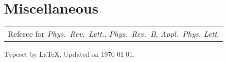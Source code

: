 \documentclass[a4paper, 11pt, DIV=15,headings=normal]{scrartcl}
\begin{document}
\section*{Miscellaneous}
\begin{tabular}{l}
Referee for \textit{Phys.\ Rev.\ Lett.}, \textit{Phys.\ Rev.\ B}, \textit{Appl.\ Phys. Lett}.
\end{tabular}

\begin{refsection}[cv.bib]
\nocite{*}
\printbibliography[resetnumbers=true, title={Publications (chronological order)}]
\end{refsection}

\vspace{6mm}

\begin{minipage}{0.4\linewidth}
\scriptsize Typeset by \LaTeX. Updated on \today.
\end{minipage}
\end{document}
